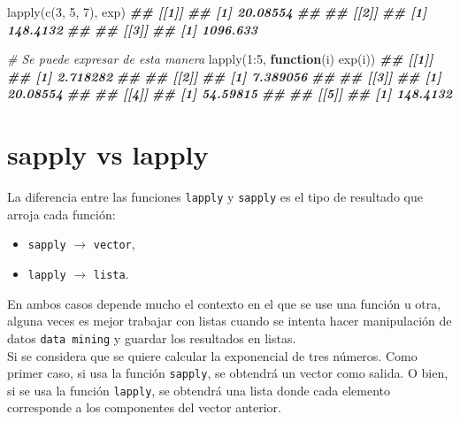 \documentclass[
]{book}
\newenvironment{Shaded}{\begin{snugshade}}{\end{snugshade}}
\newcommand{\CommentTok}[1]{\textcolor[rgb]{0.56,0.35,0.01}{\textit{#1}}}
\newcommand{\ControlFlowTok}[1]{\textcolor[rgb]{0.13,0.29,0.53}{\textbf{#1}}}
\newcommand{\DecValTok}[1]{\textcolor[rgb]{0.00,0.00,0.81}{#1}}
\newcommand{\DocumentationTok}[1]{\textcolor[rgb]{0.56,0.35,0.01}{\textbf{\textit{#1}}}}
\newcommand{\FunctionTok}[1]{\textcolor[rgb]{0.00,0.00,0.00}{#1}}
\newcommand{\NormalTok}[1]{#1}
\newcommand{\SpecialCharTok}[1]{\textcolor[rgb]{0.00,0.00,0.00}{#1}}
\providecommand{\tightlist}{%
  \setlength{\itemsep}{0pt}\setlength{\parskip}{0pt}}
\begin{document}
\begin{Shaded}
\begin{Highlighting}[]
\FunctionTok{lapply}\NormalTok{(}\FunctionTok{c}\NormalTok{(}\DecValTok{3}\NormalTok{, }\DecValTok{5}\NormalTok{, }\DecValTok{7}\NormalTok{), exp)}
\DocumentationTok{\#\# [[1]]}
\DocumentationTok{\#\# [1] 20.08554}
\DocumentationTok{\#\# }
\DocumentationTok{\#\# [[2]]}
\DocumentationTok{\#\# [1] 148.4132}
\DocumentationTok{\#\# }
\DocumentationTok{\#\# [[3]]}
\DocumentationTok{\#\# [1] 1096.633}

\CommentTok{\# Se puede expresar de esta manera}
\FunctionTok{lapply}\NormalTok{(}\DecValTok{1}\SpecialCharTok{:}\DecValTok{5}\NormalTok{, }\ControlFlowTok{function}\NormalTok{(i) }\FunctionTok{exp}\NormalTok{(i))}
\DocumentationTok{\#\# [[1]]}
\DocumentationTok{\#\# [1] 2.718282}
\DocumentationTok{\#\# }
\DocumentationTok{\#\# [[2]]}
\DocumentationTok{\#\# [1] 7.389056}
\DocumentationTok{\#\# }
\DocumentationTok{\#\# [[3]]}
\DocumentationTok{\#\# [1] 20.08554}
\DocumentationTok{\#\# }
\DocumentationTok{\#\# [[4]]}
\DocumentationTok{\#\# [1] 54.59815}
\DocumentationTok{\#\# }
\DocumentationTok{\#\# [[5]]}
\DocumentationTok{\#\# [1] 148.4132}
\end{Highlighting}
\end{Shaded}

\hypertarget{sapply-vs-lapply}{%
\section{sapply vs lapply}\label{sapply-vs-lapply}}

La diferencia entre las funciones \texttt{lapply} y \texttt{sapply} es el tipo de resultado que arroja cada función:

\begin{itemize}
\tightlist
\item
  \texttt{sapply} \(\rightarrow\) \texttt{vector},\\
\item
  \texttt{lapply} \(\rightarrow\) \texttt{lista}.
\end{itemize}

En ambos casos depende mucho el contexto en el que se use una función u otra, alguna veces es mejor trabajar con listas cuando se intenta hacer manipulación de datos \texttt{data\ mining} y guardar los resultados en listas.\\
Si se considera que se quiere calcular la exponencial de tres números. Como primer caso, si usa la función \texttt{sapply}, se obtendrá un vector como salida. O bien, si se usa la función \texttt{lapply}, se obtendrá una lista donde cada elemento corresponde a los componentes del vector anterior.
\end{document}
